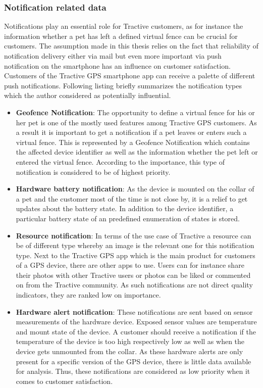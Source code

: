 \subsubsection{Notification related data} 
Notifications play an essential role for Tractive customers, as for instance the information whether a pet has left a defined virtual fence can be crucial for customers. The assumption made in this thesis relies on the fact that reliability of notification delivery either via mail but even more important via push notification on the smartphone has an influence on customer satisfaction. Customers of the Tractive GPS smartphone app can receive a palette of different push notifications. Following listing briefly summarizes the notification types which the author considered as potentially influential.

\begin{itemize}
	\item \textbf{Geofence Notification}: The opportunity to define a virtual fence for his or her pet is one of the mostly used features among Tractive GPS customers. As a result it is important to get a notification if a pet leaves or enters such a virtual fence. This is represented by a Geofence Notification which contains the affected device identifier as well as the information whether the pet left or entered the virtual fence. According to the importance, this type of notification is considered to be of highest priority. 
	\item \textbf{Hardware battery notification}: As the device is mounted on the collar of a pet and the customer most of the time is not close by, it is a relief to get updates about the battery state. In addition to the device identifier, a particular battery state of an predefined enumeration of states is stored.
	\item \textbf{Resource notification}: In terms of the use case of Tractive a resource can be of different type whereby an image is the relevant one for this notification type. Next to the Tractive GPS app which is the main product for customers of a GPS device, there are other apps to use. Users can for instance share their photos with other Tractive users or photos can be liked or commented on from the Tractive community. As such notifications are not direct quality indicators, they are ranked low on importance.
	\item \textbf{Hardware alert notification}: These notifications are sent based on sensor measurements of the hardware device. Exposed sensor values are temperature and mount state of the device. A customer should receive a notification if the temperature of the device is too high respectively low as well as when the device gets unmounted from the collar. As these hardware alerts are only present for a specific version of the GPS device, there is little data available for analysis. Thus, these notifications are considered as low priority when it comes to customer satisfaction.
\end{itemize}

